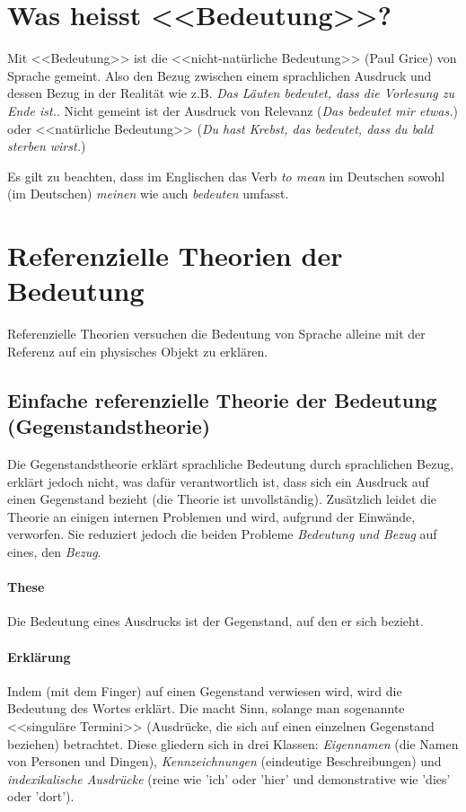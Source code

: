 \documentclass[../main.tex]{subfiles}
\begin{document}
\section{Was heisst <<Bedeutung>>?}

Mit <<Bedeutung>> ist die <<nicht-natürliche Bedeutung>> (Paul Grice) von Sprache gemeint. Also den Bezug zwischen einem sprachlichen Ausdruck und dessen Bezug in der Realität wie z.B. \textit{Das Läuten bedeutet, dass die Vorlesung zu Ende ist.}. Nicht gemeint ist der Ausdruck von Relevanz (\textit{Das bedeutet mir etwas.}) oder <<natürliche Bedeutung>> (\textit{Du hast Krebst, das bedeutet, dass du bald sterben wirst.})

Es gilt zu beachten, dass im Englischen das Verb \textit{to mean} im Deutschen sowohl (im Deutschen) \textit{meinen} wie auch \textit{bedeuten} umfasst. 

\section{Referenzielle Theorien der Bedeutung}
Referenzielle Theorien versuchen die Bedeutung von Sprache alleine mit der Referenz auf ein physisches Objekt zu erklären. 

\subsection{Einfache referenzielle Theorie der Bedeutung (Gegenstandstheorie)}\label{SectionGegenstandstheorie}
\begin{infobox}
Die Gegenstandstheorie erklärt sprachliche Bedeutung durch sprachlichen Bezug, erklärt jedoch nicht, was dafür verantwortlich ist, dass sich ein Ausdruck auf einen Gegenstand bezieht (die Theorie ist unvollständig). Zusätzlich leidet die Theorie an einigen internen Problemen und wird, aufgrund der Einwände, verworfen. Sie reduziert jedoch die beiden Probleme \textit{Bedeutung und Bezug} auf eines, den \textit{Bezug}.	
\end{infobox}

\paragraph{These} Die Bedeutung eines Ausdrucks ist der Gegenstand, auf den er sich bezieht.

\paragraph{Erklärung} Indem (mit dem Finger) auf einen Gegenstand verwiesen wird, wird die Bedeutung des Wortes erklärt. Die macht Sinn, solange man sogenannte <<singuläre Termini>> (Ausdrücke, die sich auf einen einzelnen Gegenstand beziehen) betrachtet. Diese gliedern sich in drei Klassen: \textit{Eigennamen} (die Namen von Personen und Dingen), \textit{Kennzeichnungen} (eindeutige Beschreibungen) und \textit{indexikalische Ausdrücke} (reine wie 'ich' oder 'hier' und demonstrative wie 'dies' oder 'dort').
\end{document}
